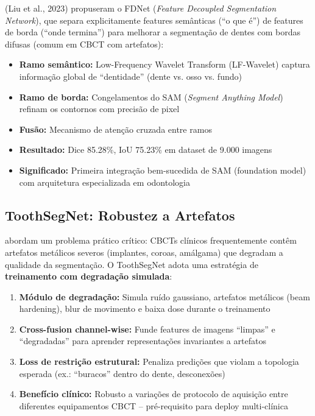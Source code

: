  (Liu et al., 2023) propuseram o FDNet (\textit{Feature
Decoupled Segmentation Network}), que separa explicitamente features semânticas
(``o que é'') de features de borda (``onde termina'') para melhorar a
segmentação de dentes com bordas difusas (comum em CBCT com artefatos):

\begin{itemize}
  \item \textbf{Ramo semântico:} Low-Frequency Wavelet Transform (LF-Wavelet)
        captura informação global de ``dentidade'' (dente vs. osso vs. fundo)
  \item \textbf{Ramo de borda:} Congelamentos do SAM (\textit{Segment Anything
        Model}) refinam os contornos com precisão de pixel
  \item \textbf{Fusão:} Mecanismo de atenção cruzada entre ramos
  \item \textbf{Resultado:} Dice 85.28\%, IoU 75.23\% em dataset de 9.000 imagens
  \item \textbf{Significado:} Primeira integração bem-sucedida de SAM (foundation
        model) com arquitetura especializada em odontologia
\end{itemize}

\subsection{ToothSegNet: Robustez a Artefatos}

 abordam um problema prático crítico: CBCTs clínicos
frequentemente contêm artefatos metálicos severos (implantes, coroas, amálgama)
que degradam a qualidade da segmentação. O ToothSegNet adota uma estratégia de
\textbf{treinamento com degradação simulada}:

\begin{enumerate}
  \item \textbf{Módulo de degradação:} Simula ruído gaussiano, artefatos
        metálicos (beam hardening), blur de movimento e baixa dose durante
        o treinamento
  \item \textbf{Cross-fusion channel-wise:} Funde features de imagens ``limpas''
        e ``degradadas'' para aprender representações invariantes a artefatos
  \item \textbf{Loss de restrição estrutural:} Penaliza predições que violam
        a topologia esperada (ex.: ``buracos'' dentro do dente, desconexões)
  \item \textbf{Benefício clínico:} Robusto a variações de protocolo de
        aquisição entre diferentes equipamentos CBCT -- pré-requisito para
        deploy multi-clínica
\end{enumerate}

